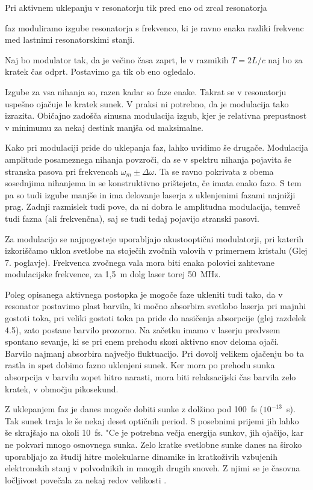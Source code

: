 Pri aktivnem uklepanju v resonatorju tik pred eno od zrcal
resonatorja 

faz moduliramo izgube resonatorja 
s frekvenco, ki je ravno enaka razliki 
frekvenc med lastnimi resonatorskimi stanji. 



Naj bo modulator tak, da je večino časa zaprt, 
le v razmikih $T=2L/c$ naj bo za kratek čas odprt. 
Postavimo ga tik ob eno ogledalo. 

Izgube za vsa nihanja so, razen 
kadar so faze enake. Takrat se v resonatorju uspešno ojačuje 
le kratek sunek. V praksi ni potrebno, da je modulacija tako izrazita. 
Običajno zadošča sinusna modulacija izgub, kjer je relativna prepustnost v minimumu
za nekaj destink manjša od maksimalne.

Kako pri modulaciji pride do uklepanja faz, lahko uvidimo še drugače.
Modulacija amplitude posameznega nihanja povzroči, da se v spektru nihanja
pojavita še stranska pasova pri frekvencah $\omega_m \pm \Delta\omega$. Ta
se ravno pokrivata z obema sosednjima nihanjema in se konstruktivno
prištejeta, če imata enako fazo. S tem pa so tudi izgube manjše in ima
delovanje laserja z uklenjenimi fazami najnižji prag. Zadnji razmislek
tudi pove, da ni dobra le amplitudna modulacija, temveč tudi fazna (ali
frekvenčna), saj se tudi tedaj pojavijo stranski pasovi.

Za modulacijo se najpogosteje uporabljajo akustooptični modulatorji, pri
katerih izkoriščamo uklon svetlobe na stoječih zvočnih valovih v
primernem kristalu (Glej 7. poglavje). Frekvenca zvočnega vala mora biti
enaka polovici zahtevane modulacijske frekvence, za 1,5~m dolg laser torej
50~MHz.

Poleg opisanega aktivnega postopka je mogoče faze ukleniti tudi tako, da v
resonator postavimo plast barvila, ki močno absorbira svetlobo laserja pri
majnhi gostoti toka, pri veliki gostoti toka pa pride do nasičenja
absorpcije (glej razdelek 4.5), zato postane barvilo prozorno. Na začetku
imamo v laserju predvsem spontano sevanje, ki se pri enem prehodu skozi
aktivno snov deloma ojači. Barvilo najmanj absorbira največjo fluktuacijo.
Pri dovolj velikem ojačenju bo ta rastla in spet dobimo fazno uklenjeni
sunek. Ker mora po prehodu sunka absorpcija v barvilu zopet hitro narasti,
mora biti relaksacijski čas barvila zelo kratek, v območju pikosekund.

Z uklepanjem faz je danes mogoče dobiti sunke z dolžino pod 100~fs ($%
10^{-13}$~s). Tak sunek traja le še nekaj deset optičnih period. S
posebnimi prijemi jih lahko še skrajšajo na okoli 10~fs. "Ce je potrebna
večja energija sunkov, jih ojačijo, kar ne pokvari mnogo osnovnega sunka.
Zelo kratke svetlobne sunke danes na široko uporabljajo za študij hitre
molekularne dinamike in kratkoživih vzbujenih elektronskih stanj v
polvodnikih in mnogih drugih snoveh. Z njimi se je časovna ločljivost
povečala za nekaj redov velikosti \cite{pikosekunde}.

